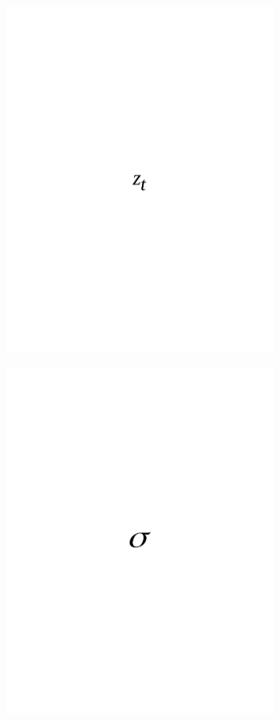 \begin{figure}[H]
	\centering
	\includegraphics[width=0.8\textwidth]{media/ict/image65}
	\caption*{}
\end{figure}

\begin{figure}[H]
	\centering
	\includegraphics[width=0.8\textwidth]{media/ict/image47}
	\caption*{}
\end{figure}

